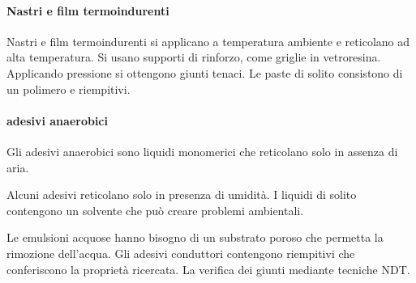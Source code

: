 \paragraph{Nastri e film termoindurenti}
Nastri e film termoindurenti si applicano a temperatura ambiente e reticolano ad alta temperatura.
Si usano supporti di rinforzo, come griglie in vetroresina.
Applicando pressione si ottengono giunti tenaci.
Le paste di solito consistono di un polimero e riempitivi.

\paragraph{adesivi anaerobici}
Gli adesivi anaerobici sono liquidi monomerici che reticolano solo in assenza di aria.

Alcuni adesivi reticolano solo in presenza di umidità. I liquidi di solito contengono un solvente che può creare problemi ambientali.

Le emulsioni acquose hanno bisogno di un substrato poroso che permetta la rimozione dell'acqua.
Gli adesivi conduttori contengono riempitivi che conferiscono la proprietà ricercata.
La verifica dei giunti mediante tecniche NDT.

\begin{figure}
\centering
{}\quad
{}
\end{figure}

